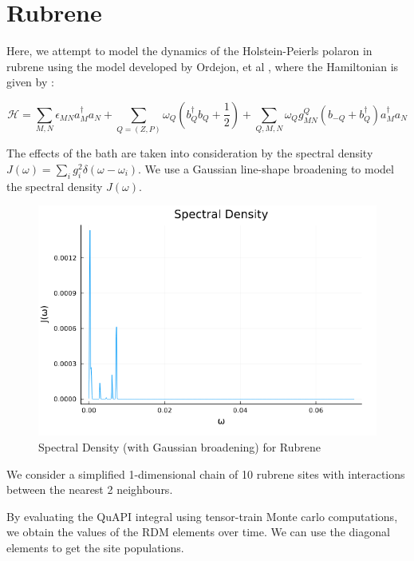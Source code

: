 \section{Rubrene}

Here, we attempt to model the dynamics of the Holstein-Peierls polaron in rubrene using the model developed by Ordejon, et al \cite{Ordejn2017}, where the Hamiltonian is given by :

\begin{equation}
    \mathcal{H} = \sum_{M,N} \epsilon_{MN} a_M^{\dag}a_N + \sum_{Q = (Z,P)} \omega_{Q} (b_Q^{\dag} b_{Q} + \frac{1}{2}) + \sum_{Q, M, N} \omega_{Q} g_{MN}^{Q}(b_{-Q} + b_{Q}^{\dag})a_M^{\dag}a_N 
\end{equation}

The effects of the bath are taken into consideration by the spectral density $J(\omega) = \sum_{i} g_i ^{2} \delta(\omega - \omega_i)$. We use a Gaussian line-shape broadening to model the spectral density $J(\omega)$.


\begin{figure}
    \center
    \includegraphics[scale=0.4]{Figures/jw_rubrene.png}
    \caption{Spectral Density (with Gaussian broadening) for Rubrene}
\end{figure}

We consider a simplified 1-dimensional chain of 10 rubrene sites with interactions between the nearest 2 neighbours.

By evaluating the QuAPI integral using tensor-train Monte carlo computations, we obtain the values of the RDM elements over time. We can use the diagonal elements to get the site populations.

